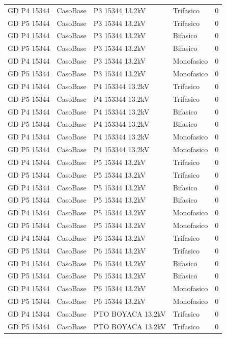 \documentclass[11pt,a4paper]{article}
\begin{document}
\begin{longtable}{llllr}
GD P4 15344 & CasoBase & P3 15344 13.2kV & Trifasico & 0 \\
GD P5 15344 & CasoBase & P3 15344 13.2kV & Trifasico & 0 \\
GD P4 15344 & CasoBase & P3 15344 13.2kV & Bifasico & 0 \\
GD P5 15344 & CasoBase & P3 15344 13.2kV & Bifasico & 0 \\
GD P4 15344 & CasoBase & P3 15344 13.2kV & Monofasico & 0 \\
GD P5 15344 & CasoBase & P3 15344 13.2kV & Monofasico & 0 \\
GD P4 15344 & CasoBase & P4 153344 13.2kV & Trifasico & 0 \\
GD P5 15344 & CasoBase & P4 153344 13.2kV & Trifasico & 0 \\
GD P4 15344 & CasoBase & P4 153344 13.2kV & Bifasico & 0 \\
GD P5 15344 & CasoBase & P4 153344 13.2kV & Bifasico & 0 \\
GD P4 15344 & CasoBase & P4 153344 13.2kV & Monofasico & 0 \\
GD P5 15344 & CasoBase & P4 153344 13.2kV & Monofasico & 0 \\
GD P4 15344 & CasoBase & P5 15344 13.2kV & Trifasico & 0 \\
GD P5 15344 & CasoBase & P5 15344 13.2kV & Trifasico & 0 \\
GD P4 15344 & CasoBase & P5 15344 13.2kV & Bifasico & 0 \\
GD P5 15344 & CasoBase & P5 15344 13.2kV & Bifasico & 0 \\
GD P4 15344 & CasoBase & P5 15344 13.2kV & Monofasico & 0 \\
GD P5 15344 & CasoBase & P5 15344 13.2kV & Monofasico & 0 \\
GD P4 15344 & CasoBase & P6 15344 13.2kV & Trifasico & 0 \\
GD P5 15344 & CasoBase & P6 15344 13.2kV & Trifasico & 0 \\
GD P4 15344 & CasoBase & P6 15344 13.2kV & Bifasico & 0 \\
GD P5 15344 & CasoBase & P6 15344 13.2kV & Bifasico & 0 \\
GD P4 15344 & CasoBase & P6 15344 13.2kV & Monofasico & 0 \\
GD P5 15344 & CasoBase & P6 15344 13.2kV & Monofasico & 0 \\
GD P4 15344 & CasoBase & PTO BOYACA 13.2kV & Trifasico & 0 \\
GD P5 15344 & CasoBase & PTO BOYACA 13.2kV & Trifasico & 0 \\

\end{longtable}
\end{document}
